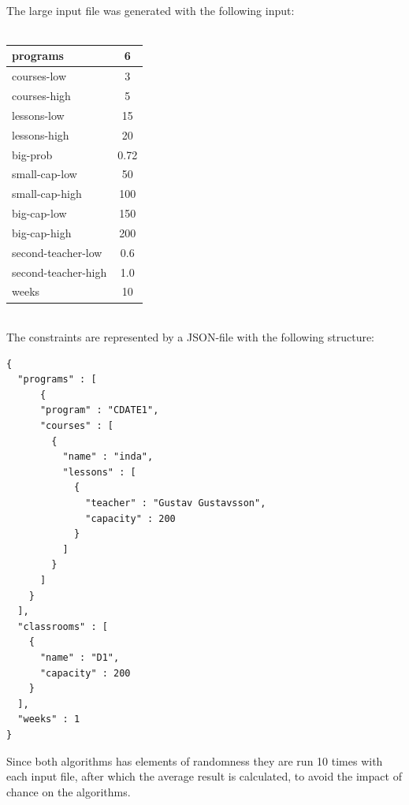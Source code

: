 \documentclass[titlepage,a4paper]{article}
\begin{document}
\medskip \\
The large input file was generated with the following input: \\\\
\medskip
\begin{tabular}{| l | c |}
  \hline
  programs & 6 \\
  \hline
  courses-low & 3 \\
  \hline
  courses-high & 5 \\
  \hline
  lessons-low & 15 \\
  \hline  
  lessons-high & 20 \\
  \hline  
  big-prob & 0.72 \\
  \hline  
  small-cap-low & 50 \\
  \hline  
  small-cap-high & 100 \\
  \hline  
  big-cap-low & 150 \\
  \hline  
  big-cap-high & 200 \\
  \hline  
  second-teacher-low & 0.6 \\
  \hline  
  second-teacher-high & 1.0 \\
  \hline
  weeks & 10 \\
  \hline
\end{tabular}
\medskip \\

The constraints are represented by a JSON-file with the following structure:

\begin{verbatim}
{
  "programs" : [
      {
      "program" : "CDATE1",
      "courses" : [
        {
          "name" : "inda",
          "lessons" : [
            {
              "teacher" : "Gustav Gustavsson",
              "capacity" : 200
            }      
          ]
        }
      ]
    }
  ],
  "classrooms" : [
    {
      "name" : "D1",
      "capacity" : 200
    }
  ],
  "weeks" : 1
}

\end{verbatim}
Since both algorithms has elements of randomness they are run 10 times with each input file, after which the average result is calculated, to avoid the impact of chance on the algorithms. \\\\
\end{document}

